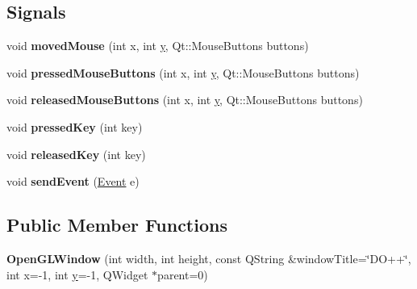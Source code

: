 \subsection*{Signals}
\begin{DoxyCompactItemize}
\item 
\hypertarget{class_d_o_1_1_open_g_l_window_aa284cd282d9c672d56291f539ad864c7}{void {\bfseries moved\-Mouse} (int x, int \hyperlink{group___channel_accessors_gac90c52c5b3a7b2a7e3761e6e84f25778}{y}, Qt\-::\-Mouse\-Buttons buttons)}\label{class_d_o_1_1_open_g_l_window_aa284cd282d9c672d56291f539ad864c7}

\item 
\hypertarget{class_d_o_1_1_open_g_l_window_a211d59c0a6baf6072e762c542472efe6}{void {\bfseries pressed\-Mouse\-Buttons} (int x, int \hyperlink{group___channel_accessors_gac90c52c5b3a7b2a7e3761e6e84f25778}{y}, Qt\-::\-Mouse\-Buttons buttons)}\label{class_d_o_1_1_open_g_l_window_a211d59c0a6baf6072e762c542472efe6}

\item 
\hypertarget{class_d_o_1_1_open_g_l_window_aa6e288186f3b4d8668cbcb77d4d5cc71}{void {\bfseries released\-Mouse\-Buttons} (int x, int \hyperlink{group___channel_accessors_gac90c52c5b3a7b2a7e3761e6e84f25778}{y}, Qt\-::\-Mouse\-Buttons buttons)}\label{class_d_o_1_1_open_g_l_window_aa6e288186f3b4d8668cbcb77d4d5cc71}

\item 
\hypertarget{class_d_o_1_1_open_g_l_window_af3120a375a321654553779cf030a9508}{void {\bfseries pressed\-Key} (int key)}\label{class_d_o_1_1_open_g_l_window_af3120a375a321654553779cf030a9508}

\item 
\hypertarget{class_d_o_1_1_open_g_l_window_ac80bf1948c09a26181b72cb51f4ea4c3}{void {\bfseries released\-Key} (int key)}\label{class_d_o_1_1_open_g_l_window_ac80bf1948c09a26181b72cb51f4ea4c3}

\item 
\hypertarget{class_d_o_1_1_open_g_l_window_a497371cbad118b80dc07aa5c288f2573}{void {\bfseries send\-Event} (\hyperlink{struct_d_o_1_1_event}{Event} e)}\label{class_d_o_1_1_open_g_l_window_a497371cbad118b80dc07aa5c288f2573}

\end{DoxyCompactItemize}
\subsection*{Public Member Functions}
\begin{DoxyCompactItemize}
\item 
\hypertarget{class_d_o_1_1_open_g_l_window_a45e95ebd64819b9cda9828c60e38bb03}{{\bfseries Open\-G\-L\-Window} (int width, int height, const Q\-String \&window\-Title=\char`\"{}D\-O++\char`\"{}, int x=-\/1, int \hyperlink{group___channel_accessors_gac90c52c5b3a7b2a7e3761e6e84f25778}{y}=-\/1, Q\-Widget $\ast$parent=0)}\label{class_d_o_1_1_open_g_l_window_a45e95ebd64819b9cda9828c60e38bb03}

\end{DoxyCompactItemize}
